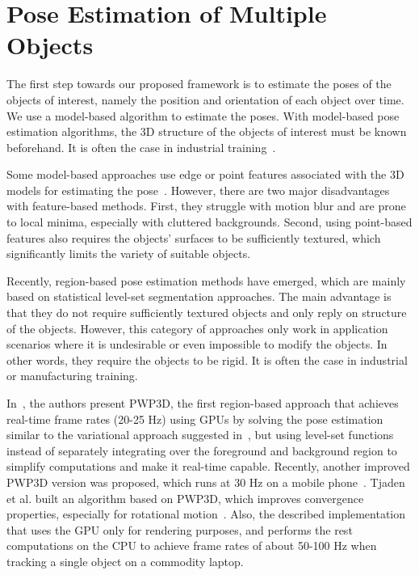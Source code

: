 \section{Pose Estimation of Multiple Objects}

The first step towards our proposed framework is to estimate the poses of the objects of interest, namely the position and orientation of each object over time.
We use a model-based algorithm to estimate the poses.
With model-based pose estimation algorithms, the 3D structure of the objects of interest must be known beforehand. It is often the case in industrial training~\cite{cremers2007}.

Some model-based approaches use edge or point features associated with the 3D models for estimating the pose~\cite{harris1990,vacchetti2004,park2008,kim2010}.
However, there are two major disadvantages with feature-based methods.
First, they struggle with motion blur and are prone to local minima, especially with cluttered backgrounds.
Second, using point-based features also requires the objects' surfaces to be sufficiently textured, which significantly limits the variety of suitable objects.

Recently, region-based pose estimation methods have emerged, which are mainly based on statistical level-set segmentation approaches.
The main advantage is that they do not require sufficiently textured objects and only reply on structure of the objects.
However, this category of approaches only work in application scenarios where it is undesirable or even impossible to modify the objects. In other words, they require the objects to be rigid. It is often the case in industrial or manufacturing training.

In~\cite{prisacariu2012}, the authors present PWP3D, the first region-based  approach that achieves real-time frame rates (20-25 Hz) using GPUs by solving the pose estimation similar to the variational approach suggested in~\cite{dambreville2010}, but using level-set functions instead of separately integrating over the foreground and background region to simplify computations and make it real-time capable.
Recently, another improved PWP3D version was proposed, which runs at 30 Hz on a mobile phone~\cite{prisacariu2015}.
Tjaden et al. built an algorithm based on PWP3D, which improves convergence properties, especially for rotational motion~\cite{tjaden2016}. Also, the described implementation that uses the GPU only for rendering purposes, and performs the rest computations on the CPU to achieve frame rates of about 50-100 Hz when tracking a single object on a commodity laptop.

